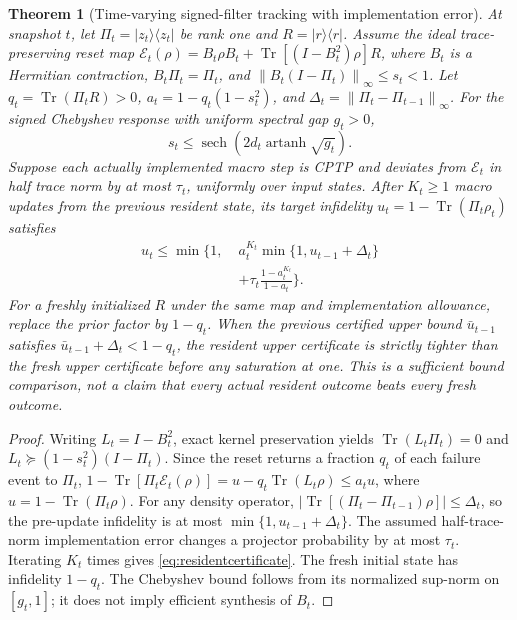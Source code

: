 \documentclass{ieeeaccess}
\newtheorem{theorem}{Theorem}\newtheorem{lemma}{Lemma}
\newcommand{\norm}[1]{\left\lVert #1\right\rVert}
\newcommand{\ket}[1]{\lvert #1\rangle}\newcommand{\bra}[1]{\langle #1\rvert}
\newcommand{\Tr}{\operatorname{Tr}}\newcommand{\E}{\mathcal E}
\begin{document}
\begin{theorem}[Time-varying signed-filter tracking with implementation error]
\label{thm:residentcertificate}
At snapshot $t$, let $\Pi_t=\ket{z_t}\bra{z_t}$ be rank one and
$R=\ket r\bra r$. Assume the \emph{ideal} trace-preserving reset map
$\E_t(\rho)=B_t\rho B_t+\Tr[(I-B_t^2)\rho]R$, where $B_t$ is a Hermitian
contraction, $B_t\Pi_t=\Pi_t$, and
$\norm{B_t(I-\Pi_t)}_\infty\le s_t<1$. Let
$q_t=\Tr(\Pi_t R)>0$,
$a_t=1-q_t(1-s_t^2)$, and
$\Delta_t=\norm{\Pi_t-\Pi_{t-1}}_\infty$.
For the signed Chebyshev response with uniform spectral gap $g_t>0$,
\begin{equation}\label{eq:degreecertificate}
s_t\le\operatorname{sech}\!\left(2d_t
                 \operatorname{artanh}\sqrt{g_t}\right).
\end{equation}
Suppose each actually implemented macro step is CPTP and deviates from
$\E_t$ in half trace norm by at most $\tau_t$, uniformly over input
states. After $K_t\ge1$ macro updates from the previous resident state,
its target infidelity $u_t=1-\Tr(\Pi_t\rho_t)$ satisfies
\begin{align}\label{eq:residentcertificate}
u_t\le \min\Bigg\{1,\;&a_t^{K_t}\min\{1,u_{t-1}+\Delta_t\}\nonumber\\
&+\tau_t\frac{1-a_t^{K_t}}{1-a_t}\Bigg\}.
\end{align}
For a freshly initialized $R$ under the same map and implementation
allowance, replace the prior factor by $1-q_t$. When the
previous \emph{certified} upper bound $\bar u_{t-1}$ satisfies
$\bar u_{t-1}+\Delta_t<1-q_t$, the resident upper certificate is
strictly tighter than the fresh upper certificate before any
saturation at one. This is a sufficient \emph{bound comparison}, not
a claim that every actual resident outcome beats every fresh outcome.
\end{theorem}
\begin{proof}
Writing $L_t=I-B_t^2$, exact kernel preservation yields
$\Tr(L_t\Pi_t)=0$ and
$L_t\succeq(1-s_t^2)(I-\Pi_t)$. Since the reset returns a fraction
$q_t$ of each failure event to $\Pi_t$,
$1-\Tr[\Pi_t\E_t(\rho)]
=u-q_t\Tr(L_t\rho)\le a_tu$, where
$u=1-\Tr(\Pi_t\rho)$. For any density operator,
$\left|\Tr[(\Pi_t-\Pi_{t-1})\rho]\right|\le\Delta_t$,
so the pre-update infidelity is at most
$\min\{1,u_{t-1}+\Delta_t\}$. The assumed half-trace-norm
implementation error changes a projector probability by at most
$\tau_t$. Iterating $K_t$ times gives \eqref{eq:residentcertificate}.
The fresh initial state has infidelity $1-q_t$.
The Chebyshev bound follows from its normalized sup-norm on
$[g_t,1]$; it does not imply efficient synthesis of $B_t$.
\end{proof}
\end{document}
